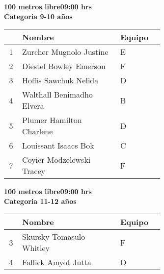 \begin{minipage}{0.95\linewidth}\vspace{0.5cm} 
\begin{flushleft}
\textbf{
\hspace{-0.15cm}100 metros libre\hspace{1.5cm}09:00 hrs \\Categoria 9-10 años}\vspace{-0.2cm} 
\end{flushleft}
\begin{tabular}{cp{0.63\linewidth}l}
\hline
& \textbf{Nombre} & \textbf{Equipo} \\ \hline
1 & Zurcher Mugnolo Justine & E \\ 
2 & Diestel Bowley Emerson & F \\ 
3 & Hoffis Sawchuk Nelida & D \\ 
4 & Walthall Benimadho Elvera & B \\ 
5 & Plumer Hamilton Charlene & D \\ 
6 & Louissant Isaacs Bok & C \\ 
7 & Coyier Modzelewski Tracey & F \\ 
\end{tabular}
\end{minipage}
\begin{minipage}{0.95\linewidth}\vspace{0.5cm} 
\begin{flushleft}
\textbf{
\hspace{-0.15cm}100 metros libre\hspace{1.5cm}09:00 hrs \\Categoria 11-12 años}\vspace{-0.2cm} 
\end{flushleft}
\begin{tabular}{cp{0.63\linewidth}l}
\hline
& \textbf{Nombre} & \textbf{Equipo} \\ \hline
3 & Skursky Tomasulo Whitley & F \\ 
4 & Fallick Amyot Jutta & D \\ 
\end{tabular}
\end{minipage}
